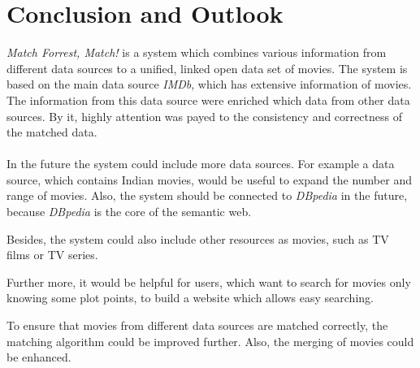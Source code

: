 \section{Conclusion and Outlook}
\label{sec_conclusion}

\emph{Match Forrest, Match!} is a system which combines various information from different data sources to a unified, linked open data set of movies.
The system is based on the main data source \textit{IMDb}, which has extensive information of movies.
The information from this data source were enriched which data from other data sources.
By it, highly attention was payed to the consistency and correctness of the matched data.
\\ \\
In the future the system could include more data sources.
For example a data source, which contains Indian movies, would be useful to expand the number and range of movies.
Also, the system should be connected to \textit{DBpedia} in the future, because \textit{DBpedia} is the core of the semantic web.

Besides, the system could also include other resources as movies, such as TV films or TV series.

Further more, it would be helpful for users, which want to search for movies only knowing some plot points, to build a website which allows easy searching.

To ensure that movies from different data sources are matched correctly, the matching algorithm could be improved further.
Also, the merging of movies could be enhanced.